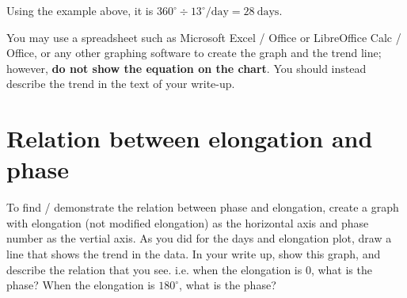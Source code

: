 \documentclass{exam}
\begin{document}
Using the example above, it is $360^\circ \div 13^\circ / \mathrm{day} = 28~\mathrm{days}$.

You may use a spreadsheet such as Microsoft Excel / Office or LibreOffice Calc / Office, or any other graphing software to create the graph and the trend line; however, \textbf{do not show the equation on the chart}. You should instead describe the trend in the text of your write-up.

\section{Relation between elongation and phase}
To find / demonstrate the relation between phase and elongation, create a graph with elongation (not modified elongation) as the horizontal axis and phase number as the vertial axis. As you did for the days and elongation plot, draw a line that shows the trend in the data. In your write up, show this graph, and describe the relation that you see. i.e. when the elongation is 0, what is the phase? When the elongation is $180^\circ$, what is the phase?



\end{document}
